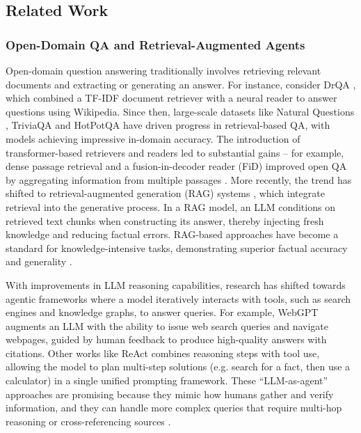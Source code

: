 \subsection{Related Work}

\subsubsection{Open-Domain QA and Retrieval-Augmented Agents}

Open-domain question answering traditionally involves retrieving relevant documents and extracting or generating an answer. For instance, consider DrQA \cite{chenReadingWikipediaAnswer2017a}, which combined a TF-IDF document retriever with a neural reader to answer questions using Wikipedia. Since then, large-scale datasets like Natural Questions \cite{kwiatkowskiNaturalQuestionsBenchmark2019a}, TriviaQA \cite{joshiTriviaQALargeScale2017} and HotPotQA \cite{yangHotpotQADatasetDiverse2018a} have driven progress in retrieval-based QA, with models achieving impressive in-domain accuracy. The introduction of transformer-based retrievers and readers led to substantial gains – for example, dense passage retrieval and a fusion-in-decoder reader (FiD) improved open QA by aggregating information from multiple passages \cite{izacardLeveragingPassageRetrieval2021}. More recently, the trend has shifted to retrieval-augmented generation (RAG) systems \cite{yaoReActSynergizingReasoning2023a}, which integrate retrieval into the generative process. In a RAG model, an LLM conditions on retrieved text chunks when constructing its answer, thereby injecting fresh knowledge and reducing factual errors. RAG-based approaches have become a standard for knowledge-intensive tasks, demonstrating superior factual accuracy and generality \cite{yaoReActSynergizingReasoning2023a}.

With improvements in LLM reasoning capabilities, research has shifted towards agentic frameworks where a model iteratively interacts with tools, such as search engines and knowledge graphs, to answer queries. For example, WebGPT \cite{nakanoWebGPTBrowserassistedQuestionanswering2022a} augments an LLM with the ability to issue web search queries and navigate webpages, guided by human feedback to produce high-quality answers with citations. Other works like ReAct \cite{yaoReActSynergizingReasoning2023a} combines reasoning steps with tool use, allowing the model to plan multi-step solutions (e.g. search for a fact, then use a calculator) in a single unified prompting framework. These ``LLM-as-agent'' approaches are promising because they mimic how humans gather and verify information, and they can handle more complex queries that require multi-hop reasoning or cross-referencing sources \cite{zhuLargeLanguageModels2025}. 

